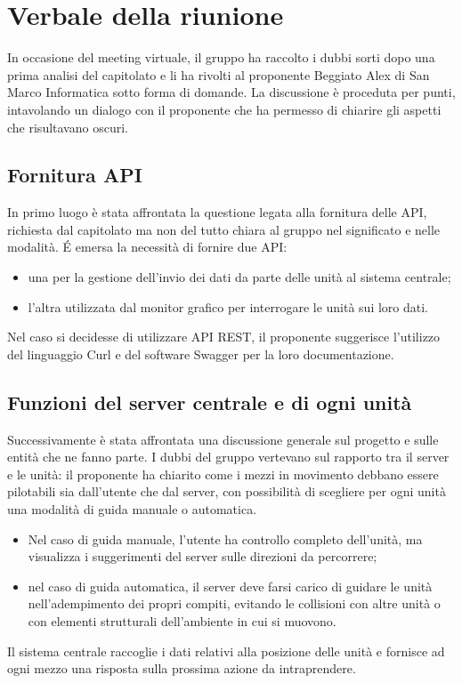\section{Verbale della riunione}

In occasione del meeting virtuale, il gruppo ha raccolto i dubbi sorti dopo una prima analisi del capitolato e li ha rivolti al proponente Beggiato Alex di San Marco Informatica sotto forma di domande. La discussione è proceduta per punti, intavolando un dialogo con il proponente che ha permesso di chiarire gli aspetti che risultavano oscuri.


\subsection{Fornitura API}
In primo luogo è stata affrontata la questione legata alla fornitura delle API, richiesta dal capitolato ma non del tutto chiara al gruppo nel significato e nelle modalità. \'E emersa la necessità di fornire due API:
\begin{itemize}
	\item una per la gestione dell'invio dei dati da parte delle unità al sistema centrale;
	\item l'altra utilizzata dal monitor grafico per interrogare le unità sui loro dati.
\end{itemize}
Nel caso si decidesse di utilizzare API REST, il proponente suggerisce l'utilizzo del linguaggio Curl e del software Swagger per la loro documentazione.

\subsection{Funzioni del server centrale e di ogni unità}
Successivamente è stata affrontata una discussione generale sul progetto e sulle entità che ne fanno parte. I dubbi del gruppo vertevano sul rapporto tra il server e le unità: il proponente ha chiarito come i mezzi in movimento debbano essere pilotabili sia dall'utente che dal server, con possibilità di scegliere per ogni unità una modalità di guida manuale o automatica. 
\begin{itemize}
	\item Nel caso di guida manuale, l'utente ha controllo completo dell'unità, ma visualizza i suggerimenti del server sulle direzioni da percorrere;
	\item nel caso di guida automatica, il server deve farsi carico di guidare le unità nell'adempimento dei propri compiti, evitando le collisioni con altre unità o con elementi strutturali dell'ambiente in cui si muovono.
\end{itemize}
 Il sistema centrale raccoglie i dati relativi alla posizione delle unità e fornisce ad ogni mezzo una risposta sulla prossima azione da intraprendere. 

